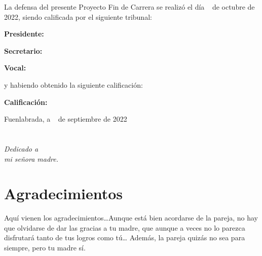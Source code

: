 \documentclass[a4paper, 12pt]{book}
\begin{document}
\vspace{1cm}
La defensa del presente Proyecto Fin de Carrera se realizó el día \qquad$\;\,$ de octubre de 2022, siendo calificada por el siguiente tribunal:


\vspace{0.5cm}
\textbf{Presidente:}

\vspace{1.2cm}
\textbf{Secretario:}

\vspace{1.2cm}
\textbf{Vocal:}


\vspace{1.2cm}
y habiendo obtenido la siguiente calificación:

\vspace{1cm}
\textbf{Calificación:}


\vspace{1cm}
\begin{flushright}
Fuenlabrada, a \qquad$\;\,$ de septiembre de 2022
\end{flushright}


\chapter*{}
\begin{flushright}
\textit{Dedicado a \\
mi señora madre.}
\end{flushright}


\chapter*{Agradecimientos}

Aquí vienen los agradecimientos\ldots Aunque está bien acordarse de la pareja, no hay que olvidarse de dar las gracias a tu madre, que aunque a veces no lo parezca disfrutará tanto de tus logros como tú\ldots 
Además, la pareja quizás no sea para siempre, pero tu madre sí.

\end{document}
